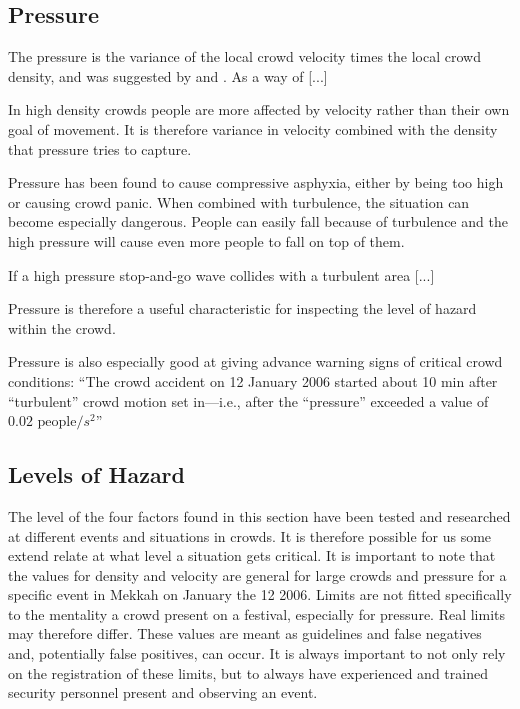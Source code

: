 \subsection{Pressure}
The pressure is the variance of the local crowd velocity times the local crowd density, and was suggested by \citeauthor{empircalstudy} \citeyearpar{empircalstudy} \cite{empircalstudy} and \citeauthor{videoanalysis} \citeyearpar{videoanalysis} \cite{videoanalysis}. As a way of [...] 

In high density crowds people are more affected by velocity rather than their own goal of movement. It is therefore variance in velocity combined with the density that pressure tries to capture.

Pressure has been found to cause compressive asphyxia, either by being too high or causing crowd panic. When combined with turbulence, the situation can become especially dangerous. People can easily fall because of turbulence and the high pressure will cause even more people to fall on top of them.

If a high pressure stop-and-go wave collides with a turbulent area [...]

Pressure is therefore a useful characteristic for inspecting the level of hazard within the crowd.

Pressure is also especially good at giving advance warning signs of critical crowd conditions: \enquote{The crowd accident on 12 January 2006 started about 10 min after “turbulent” crowd motion set in—i.e., after the “pressure” exceeded a value of $0.02 \text{ people} / s^2$}

\subsection{Levels of Hazard}
\label{subsec:levelsOfHazard}
The level of the four factors found in this section have been tested and researched at different events and situations in crowds. It is therefore possible for us some extend relate at what level a situation gets critical. It is important to note that the values for density and velocity are general for large crowds and pressure for a specific event in Mekkah on January the 12 2006. Limits are not fitted specifically to the mentality a crowd present on a festival, especially for pressure. Real limits may therefore differ. These values are meant as guidelines and false negatives and, potentially false positives, can occur. It is always important to not only rely on the registration of these limits, but to always have experienced and trained security personnel present and observing an event.

